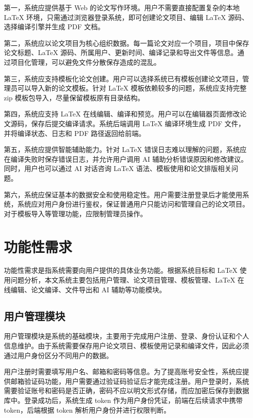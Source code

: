 \documentclass{xduugthesis}
\begin{document}
第一，系统应提供基于 Web 的论文写作环境。用户不需要直接配置复杂的本地 LaTeX 环境，只需通过浏览器登录系统，即可创建论文项目、编辑 LaTeX 源码、选择编译引擎并生成 PDF 文档。

第二，系统应以论文项目为核心组织数据。每一篇论文对应一个项目，项目中保存论文标题、LaTeX 源码、所属用户、更新时间、编译记录和导出文件等信息。通过项目化管理，可以避免文件分散保存造成的混乱。

第三，系统应支持模板化论文创建。用户可以选择系统已有模板创建论文项目，管理员可以导入新的论文模板。针对 LaTeX 模板依赖较多的问题，系统应支持完整 zip 模板包导入，尽量保留模板原有目录结构。

第四，系统应支持 LaTeX 在线编辑、编译和预览。用户可以在编辑器页面修改论文源码，保存后提交编译请求。系统后端调用 LaTeX 编译环境生成 PDF 文件，并将编译状态、日志和 PDF 路径返回给前端。

第五，系统应提供智能辅助能力。针对 LaTeX 错误日志难以理解的问题，系统应在编译失败时保存错误日志，并允许用户调用 AI 辅助分析错误原因和修改建议。同时，用户也可以通过 AI 对话咨询 LaTeX 语法、模板使用和论文排版相关问题。

第六，系统应保证基本的数据安全和使用稳定性。用户需要注册登录后才能使用系统，系统应对用户身份进行鉴权，保证普通用户只能访问和管理自己的论文项目。对于模板导入等管理功能，应限制管理员操作。

\section{功能性需求}
功能性需求是指系统需要向用户提供的具体业务功能。根据系统目标和 LaTeX 使用问题分析，本文系统主要包括用户管理、论文项目管理、模板管理、LaTeX 在线编辑、论文编译、文件导出和 AI 辅助等功能模块。

\subsection{用户管理模块}
用户管理模块是系统的基础模块，主要用于完成用户注册、登录、身份认证和个人信息维护。由于系统需要保存用户论文项目、模板使用记录和编译文件，因此必须通过用户身份区分不同用户的数据。

用户注册时需要填写用户名、邮箱和密码等信息。为了提高账号安全性，系统应提供邮箱验证码功能，用户需要通过验证码验证后才能完成注册。用户登录时，系统需要验证账号和密码是否正确，密码不应以明文形式存储，而应加密后保存到数据库中。登录成功后，系统生成 token 作为用户身份凭证，前端在后续请求中携带 token，后端根据 token 解析用户身份并进行权限判断。
\end{document}
